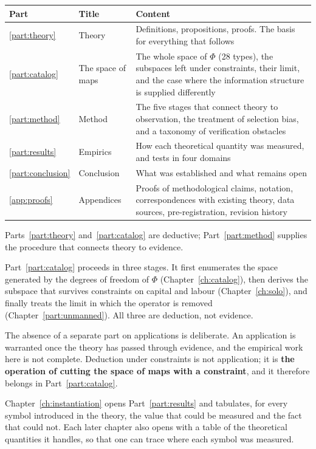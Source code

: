 \begin{center}
\begin{tabularx}{\textwidth}{@{}llX@{}}
\toprule
Part & Title & Content \\
\midrule
\ref{part:theory} & Theory & Definitions, propositions, proofs. The basis for everything that follows \\
\ref{part:catalog} & The space of maps & The whole space of $\Phi$ (28 types), the subspaces left under constraints, their limit, and the case where the information structure is supplied differently \\
\ref{part:method} & Method & The five stages that connect theory to observation, the treatment of selection bias, and a taxonomy of verification obstacles \\
\ref{part:results} & Empirics & How each theoretical quantity was measured, and tests in four domains \\
\ref{part:conclusion} & Conclusion & What was established and what remains open \\
\ref{app:proofs} & Appendices & Proofs of methodological claims, notation, correspondences with existing theory, data sources, pre-registration, revision history \\
\bottomrule
\end{tabularx}
\label{tab:part-structure}
\end{center}

Parts~\ref{part:theory} and~\ref{part:catalog} are deductive;
Part~\ref{part:method} supplies the procedure that connects theory to evidence.

Part~\ref{part:catalog} proceeds in three stages.
It first enumerates the space generated by the degrees of freedom of $\Phi$
(Chapter~\ref{ch:catalog}), then derives the subspace that survives constraints on capital
and labour (Chapter~\ref{ch:solo}), and finally treats the limit in which the operator is
removed (Chapter~\ref{part:unmanned}). All three are deduction, not evidence.

The absence of a separate part on applications is deliberate.
An application is warranted once the theory has passed through evidence, and the empirical
work here is not complete. Deduction under constraints is not application; it is
\textbf{the operation of cutting the space of maps with a constraint}, and it therefore
belongs in Part~\ref{part:catalog}.

Chapter~\ref{ch:instantiation} opens Part~\ref{part:results} and tabulates, for every symbol
introduced in the theory, the value that could be measured and the fact that could not.
Each later chapter also opens with a table of the theoretical quantities it handles, so that
one can trace where each symbol was measured.

